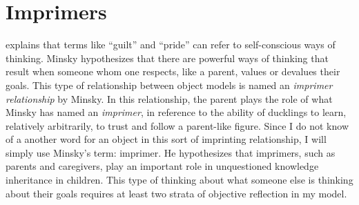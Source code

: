 \section{Imprimers}

\cite{minsky:2006} explains that terms like ``guilt'' and ``pride''
can refer to self-conscious ways of thinking.  Minsky hypothesizes
that there are powerful ways of thinking that result when someone whom
one respects, like a parent, values or devalues their goals.  This
type of relationship between object models is named an \emph{imprimer
  relationship} by Minsky.  In this relationship, the parent plays the
role of what Minsky has named an \emph{imprimer}, in reference to the
ability of ducklings to learn, relatively arbitrarily, to trust and
follow a parent-like figure.  Since I do not know of a another word
for an object in this sort of imprinting relationship, I will simply
use Minsky's term: imprimer.  He hypothesizes that imprimers, such as
parents and caregivers, play an important role in unquestioned
knowledge inheritance in children.  This type of thinking about what
someone else is thinking about their goals requires at least two
strata of objective reflection in my model.

